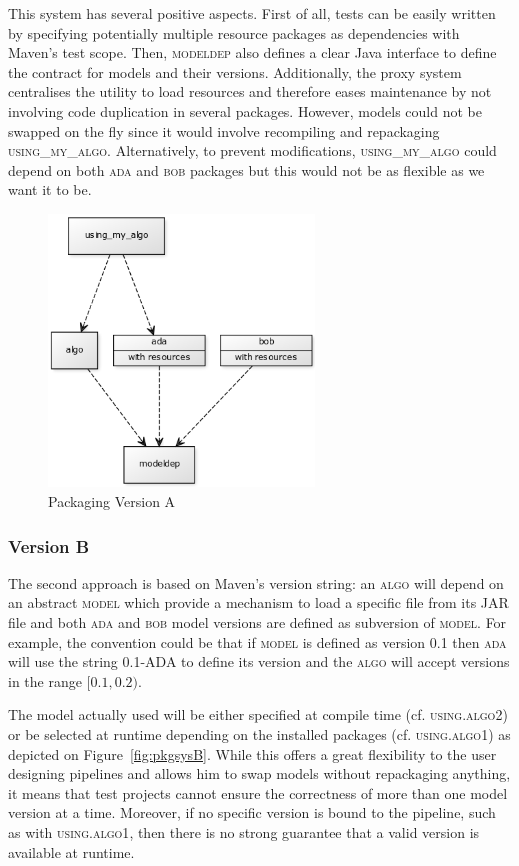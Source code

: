 \documentclass{article}
\newcommand{\ID}[1]{{\textsc{#1}}}
\newcommand{\JAR}{JAR\xspace}
\begin{document}
This system has several positive aspects. First of all, tests can be easily written by specifying potentially multiple resource packages as dependencies with Maven's test scope. Then, \ID{modeldep} also defines a clear Java interface to define the contract for models and their versions. Additionally, the proxy system centralises the utility to load resources and therefore eases maintenance by not involving code duplication in several packages. However, models could not be swapped on the fly since it would involve recompiling and repackaging \ID{using\_my\_algo}.  Alternatively, to prevent modifications, \ID{using\_my\_algo} could depend on both \ID{ada} and \ID{bob} packages but this would not be as flexible as we want it to be.

\begin{figure}
\centering
\includegraphics[width=200pt]{res/packaging_version_A.png}
\caption{Packaging Version A}
\label{fig:pkgsysA}
\end{figure}


\subsubsection{Version B}

The second approach is based on Maven's version string: an \ID{algo} will depend on an abstract
\ID{model} which provide a mechanism to load a specific file from its \JAR file and both \ID{ada}
and \ID{bob} model versions are defined as subversion of \ID{model}. For example, the convention
could be that if \ID{model} is defined as version \ID{0.1} then \ID{ada} will use the string
\ID{0.1-ADA} to define its version and the \ID{algo} will accept versions in the range $ [0.1,0.2)
$.

The model actually used will be either specified at compile time (cf. \ID{using.algo2}) or be selected at runtime depending on the installed packages (cf. \ID{using.algo1}) as depicted on Figure~\ref{fig:pkgsysB}. While this offers a great flexibility to the user designing pipelines and allows him to swap models without repackaging anything, it means that test projects cannot ensure the correctness of more than one model version at a time. Moreover, if no specific version is bound to the pipeline, such as with \ID{using.algo1}, then there is no strong guarantee that a valid version is available at runtime.
\end{document}
